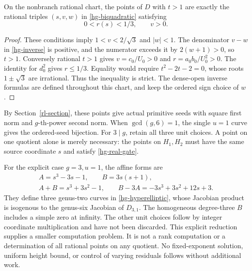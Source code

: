 \begin{theorem}\label{hg-positive}
On the nonbranch rational chart, the points of $D$ with $t>1$
are exactly the rational triples $(s,v,w)$ in
\eqref{hg-biquadratic} satisfying
\begin{equation}\label{hg-real-gate}
 0<r(s)<1/3,\qquad v>0.
\end{equation}
\end{theorem}
\begin{proof}
These conditions imply $1<v<2/\sqrt3$ and $|w|<1$.
The denominator $v-w$ in \eqref{hg-inverse} is positive,
and the numerator exceeds it by $2(w+1)>0$, so $t>1$.
Conversely rational $t>1$ gives $v=c_0/U_0>0$ and
$r=a_0b_0/U_0^2>0$. The identity for $d_0^2$ gives
$r\leq1/3$. Equality would require
$t^2-2t-2=0$, whose roots $1\pm\sqrt3$ are irrational.
Thus the inequality is strict. The dense-open inverse formulas
are defined throughout this chart, and keep the ordered sign
choice of $w$.
\end{proof}

By Section~\ref{rl-section}, these points give actual primitive
seeds with square first norm and $g$-th-power second norm.
When $\gcd(g,6)=1$, the single $u=1$ curve gives the
ordered-seed bijection. For $3\mid g$, retain all three unit
choices. A point on one quotient alone is merely necessary:
the points on $H_1,H_2$ must have the same source coordinate
$s$ and satisfy \eqref{hg-real-gate}.

For the explicit case $g=3,u=1$, the affine forms are
\begin{gather}
 A=s^3-3s-1,\qquad B=3s(s+1),\label{hg-cubic-forms}\\
 A+B=s^3+3s^2-1,\qquad
 B-3A=-3s^3+3s^2+12s+3.\nonumber
\end{gather}
They define three genus-two curves in
\eqref{hg-hyperelliptic}, whose Jacobian product is isogenous
to the genus-six Jacobian of $D_{3,1}$. The homogeneous
degree-three $B$ includes a simple zero at infinity.
The other unit choices follow by integer coordinate
multiplication and have not been discarded.
This explicit reduction supplies a smaller computation problem.
It is not a rank computation or a determination of all rational
points on any quotient. No fixed-exponent solution, uniform
height bound, or control of varying residuals follows without
additional work.
